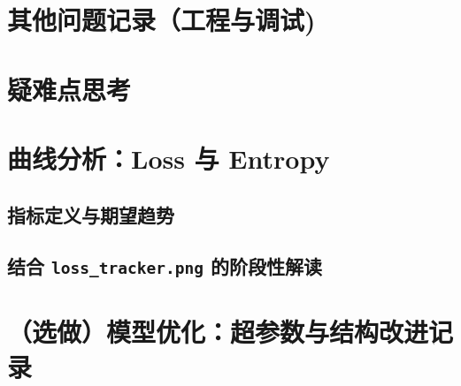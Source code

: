 \documentclass{article}
\begin{document}
\section{其他问题记录（工程与调试)}

\section{疑难点思考}

\section{曲线分析：Loss 与 Entropy}
\subsection{指标定义与期望趋势}
\subsection{结合 \texttt{loss\_tracker.png} 的阶段性解读}

\section{（选做）模型优化：超参数与结构改进记录}
\end{document}

